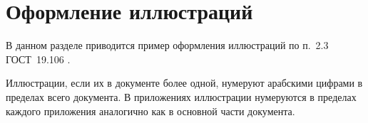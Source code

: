 \section{Оформление иллюстраций}

В данном разделе приводится пример оформления иллюстраций по п.~2.3 ГОСТ~19.106 \cite{gost19106}.

Иллюстрации, если их в документе более одной, нумеруют арабскими цифрами в
пределах всего документа. В приложениях иллюстрации нумеруются в пределах каждого приложения аналогично как в основной части документа.





%
%
%

